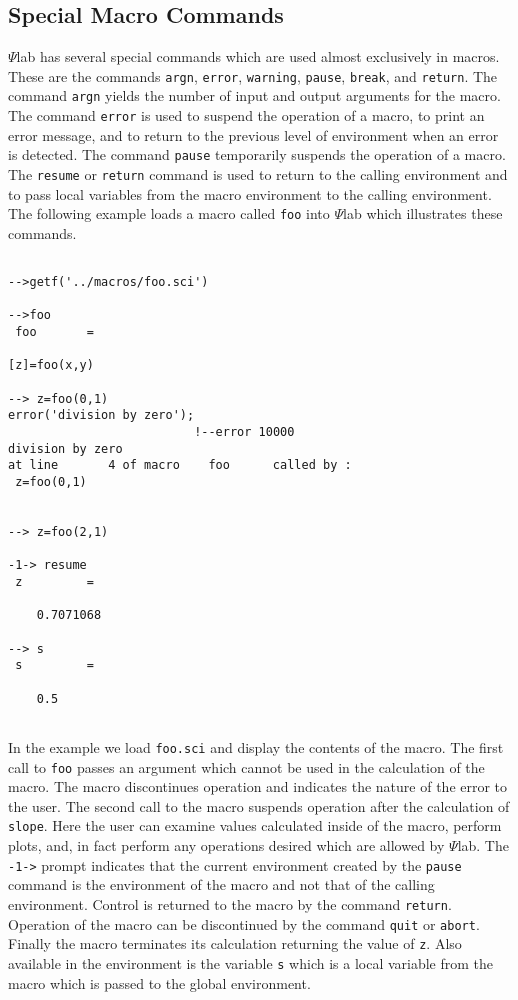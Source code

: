 \subsection{Special Macro Commands}
$\Psi$lab has several special commands which are used almost exclusively
in macros.  These are the commands 
{\tt argn}, 
{\tt error}, 
{\tt warning}, 
{\tt pause},
{\tt break}, and
{\tt return}.  
The command {\tt argn} yields the number of input
and output arguments for the macro.  The command {\tt error}
is used to suspend the operation of a macro, to print an error message,
and to return to the
previous level of environment when an error is detected.  
The command {\tt pause} temporarily suspends the operation of a macro.
The {\tt resume} or {\tt return} command is used to return to 
the calling environment and to pass local
variables from the macro environment to the calling environment. 
The following example loads a macro called {\tt foo} into $\Psi$lab which 
illustrates these commands.
\begin{verbatim}
 
-->getf('../macros/foo.sci')
 
-->foo
 foo       =
 
[z]=foo(x,y)
 
--> z=foo(0,1)
error('division by zero');
                          !--error 10000 
division by zero                                                                
at line       4 of macro    foo      called by :  
 z=foo(0,1)
 
 
--> z=foo(2,1)
 
-1-> resume
 z         =
 
    0.7071068  
 
--> s
 s         =
 
    0.5  
 
\end{verbatim}
In the example we load {\tt foo.sci} and display the contents of the
macro.  The first call to {\tt foo} passes an argument which cannot
be used in the calculation of the macro.  The macro discontinues operation
and indicates the nature of the error to the user.  The second call
to the macro suspends operation after the calculation of {\tt slope}.
Here the user can examine values calculated inside of the macro,
perform plots, and, in fact perform any operations desired which are
allowed by $\Psi$lab.  The {\tt -1->} prompt indicates that the current
environment created by the {\tt pause} command is the environment 
of the macro and not that of the calling environment.  Control is 
returned to the macro by the command {\tt return}.  Operation of the
macro can be discontinued by the command {\tt quit} or {\tt abort}.
Finally the macro terminates its calculation returning the
value of {\tt z}.  Also available in the environment is the variable
{\tt s} which is a local variable from the macro which is passed to
the global environment.


